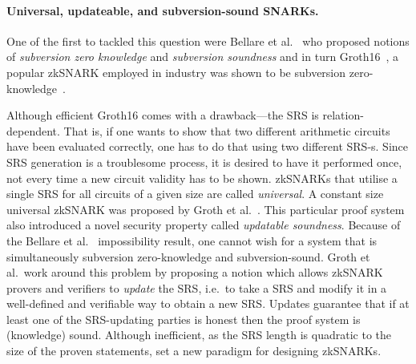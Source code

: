\documentclass[runningheads,11pt]{llncs}
\theoremstyle{definition} \newtheorem{definition}[theorem]{Definition}
\begin{document}
\paragraph{Universal, updateable, and subversion-sound SNARKs.}
One of the first to tackled this question were Bellare et al.~\cite{AC:BelFucSca16} who
proposed notions of \emph{subversion zero knowledge} and \emph{subversion
soundness} and in turn Groth16~\cite{EC:Groth16}, a popular zkSNARK employed in industry was shown to be subversion zero-knowledge~\cite{AC:ABLZ17,PKC:Fuchsbauer18}.
%
\iffalse
The former states that zero knowledge property persists even when
the SRS is produced by a malicious party. The latter states that the proof
system remains sound in the same situation. Importantly, Bellare et al.~shown
that no system can be simultaneously subversion zero-knowledge and subversion-sound.
Abdolmaleki et al.~\cite{AC:ABLZ17}, and independently Fuchsbauer
\cite{PKC:Fuchsbauer18}, shown that the most
efficient zkSNARK for QAP\footnote{QAP stands for Quadratic Arithmetic
Program. QAP is currently the most efficient representation of arithmetic
circuits for showing their validity.} by Groth \cite{EC:Groth16} can be made
subversion zero-knowledge by introducing minor modifications to its SRS and without
sacrificing its efficiency. 
\fi
%
Although efficient Groth16 comes with a drawback---the SRS is
relation-dependent. That is, if one wants to show that two different arithmetic
circuits have been evaluated correctly, one has to do that using two different
SRS-s.
Since SRS generation is a troublesome process, it is desired to have it
performed once, not every time a new circuit validity has to be shown. zkSNARKs
that utilise a single SRS for all circuits of a given size are called
\emph{universal}. A constant size universal zkSNARK was proposed by Groth et
al.~\cite{C:GKMMM18}. This particular proof system also introduced a novel
security property called \emph{updatable soundness}. Because of the Bellare et
al.~\cite{AC:BelFucSca16} impossibility result, one cannot wish for a system
that is simultaneously subversion zero-knowledge and subversion-sound. Groth et
al.~work around this problem by proposing a notion which allows zkSNARK provers
and verifiers to \emph{update} the SRS, i.e.~to take a SRS and modify it in a
well-defined and verifiable way to obtain a new SRS. Updates guarantee that if
at least one of the SRS-updating parties is honest then the proof system is
(knowledge) sound. Although inefficient, as the SRS length is quadratic to the
size of the proven statements, \cite{C:GKMMM18} set a new paradigm for designing
zkSNARKs.
\end{document}
